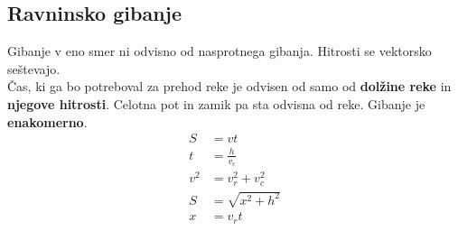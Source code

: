 {\color{indiagreen}\subsection{Ravninsko gibanje}}
Gibanje v eno smer ni odvisno od nasprotnega gibanja. Hitrosti se vektorsko seštevajo.\\
Čas, ki ga bo potreboval za prehod reke je odvisen od samo od \textbf{dolžine reke} in \textbf{njegove hitrosti}. Celotna pot in zamik pa sta odvisna od reke. Gibanje je \textbf{enakomerno}.\\

\begin{align*}
	S &= vt\\
	t &= \frac{h}{v_c}\\ 
	v^2 &= v_r^2 +v_c^2\\
	S &= \sqrt{x^2 + h^2}\\
	x &= v_r t
\end{align*}